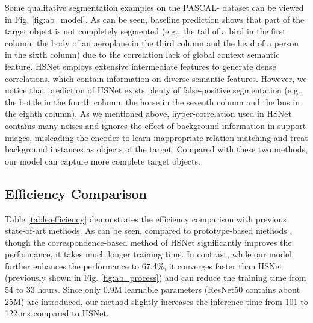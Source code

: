 \documentclass[journal]{IEEEtran}
\begin{document}
Some qualitative segmentation examples on the PASCAL- dataset can be viewed in Fig. \ref{fig:ab_model}. As can be seen, baseline prediction shows that part of the target object is not completely segmented (e.g., the tail of a bird in the first column, the body of an aeroplane in the third column and the head of a person in the sixth column) due to the correlation lack of global context semantic feature. HSNet employs extensive intermediate features to generate dense correlations, which contain information on diverse semantic features. However, we notice that prediction of HSNet exists plenty of false-positive segmentation (e.g., the bottle in the fourth column, the horse in the seventh column and the bus in the eighth column). As we mentioned above, hyper-correlation used in HSNet contains many noises and ignores the effect of background information in support images, misleading the encoder to learn inappropriate relation matching and treat background instances as objects of the target. Compared with these two methods, our model can capture more complete target objects. 

\subsection{Efficiency Comparison} 
\label{efficiency}

 {Table \ref{table:efficiency} demonstrates the efficiency comparison with previous state-of-art methods. As can be seen, compared to prototype-based methods \cite{tian2020prior,boudiaf2021few,lu2021simpler}, though the correspondence-based method of HSNet \cite{min2021hypercorrelation} significantly improves the performance, it takes much longer training time. In contrast, while our model further enhances the performance to 67.4\%, it converges faster than HSNet (previously shown in Fig. \ref{fig:ab_process}) and can reduce the training time from 54 to 33 hours. Since only 0.9M learnable parameters (ResNet50 contains about 25M) are introduced, our method slightly increases the inference time from 101 to 122 ms compared to HSNet.
}
\end{document}
